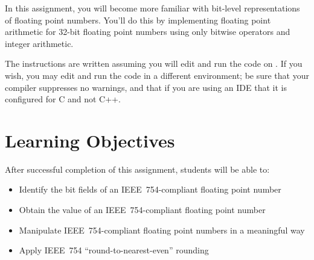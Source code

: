 



\renewcommand{\labnumber}{\floatlabnumber}
\renewcommand{\labname}{Floating Point Representation and Arithmetic Lab}
\renewcommand{\shortlabname}{floatlab}
\renewcommand{\collaborationrules}{\floatlabcollaboration}
\renewcommand{\duedate}{\floatlabdue}

\pagelayout

    \labidentifier

    In this assignment, you will become more familiar with bit-level representations of floating point numbers.
    You'll do this by implementing floating point arithmetic for 32-bit floating point numbers using only bitwise operators and integer arithmetic.

    The instructions are written assuming you will edit and run the code on \runtimeenvironment.
    If you wish, you may edit and run the code in a different environment;
    be sure that your compiler suppresses no warnings, and that if you are using an IDE that it is configured for C and not C++.

    \section*{Learning Objectives}

    After successful completion of this assignment, students will be able to:
    \begin{itemize}
        \item Identify the bit fields of an IEEE~754-compliant floating point number
        \item Obtain the value of an IEEE~754-compliant floating point number
        \item Manipulate IEEE~754-compliant floating point numbers in a meaningful way
        \item Apply IEEE~754 ``round-to-nearest-even'' rounding
    \end{itemize}

